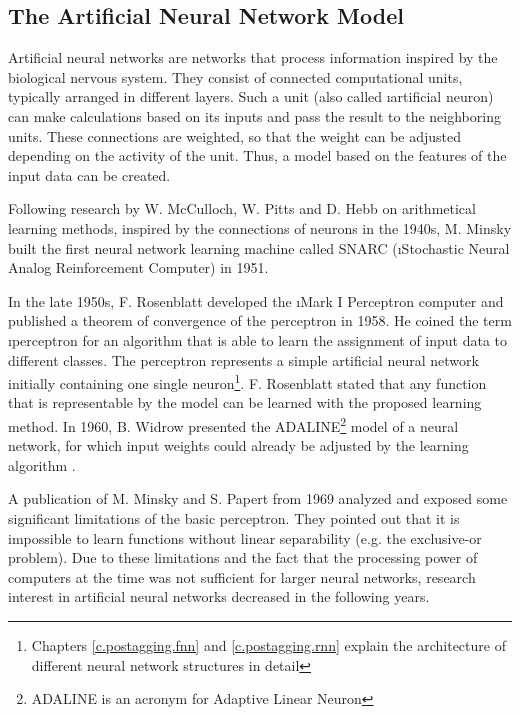 \subsection{The Artificial Neural Network Model}\label{c.introduction.related.nn}
Artificial neural networks are networks that process information inspired by the biological nervous system. They consist of connected computational units, typically arranged in different layers. Such a unit (also called \i{artificial neuron}) can make calculations based on its inputs and pass the result to the neighboring units. These connections are weighted, so that the weight can be adjusted depending on the activity of the unit. Thus, a model based on the features of the input data can be created.

Following research by W. McCulloch, W. Pitts \cite{mcculloch1943} and D. Hebb \cite{shaw1986} on arithmetical learning methods, inspired by the connections of neurons in the 1940s, M. Minsky built the first neural network learning machine called SNARC (\i{Stochastic Neural Analog Reinforcement Computer)}\cite{crevier1993} in 1951.

In the late 1950s, F. Rosenblatt developed the \i{Mark I Perceptron} computer and published a theorem of convergence of the perceptron\cite{rosenblatt1958} in 1958. He coined the term \i{perceptron} for an algorithm that is able to learn the assignment of input data to different classes. The perceptron represents a simple artificial neural network initially containing one single neuron\footnote{Chapters \ref{c.postagging.fnn} and \ref{c.postagging.rnn} explain the architecture of different neural network structures in detail}. F. Rosenblatt stated that any function that is representable by the model can be learned with the proposed learning method. In 1960, B. Widrow presented the ADALINE\footnote{ADALINE is an acronym for Adaptive Linear Neuron} model of a neural network, for which input weights could already be adjusted by the learning algorithm \cite{widrow1960}.

A publication of M. Minsky and S. Papert \cite{minsky1969} from 1969 analyzed and exposed some significant limitations of the basic perceptron. They pointed out that it is impossible to learn functions without linear separability (e.g. the exclusive-or problem). Due to these limitations and the fact that the processing power of computers at the time was not sufficient for larger neural networks, research interest in artificial neural networks decreased in the following years.

